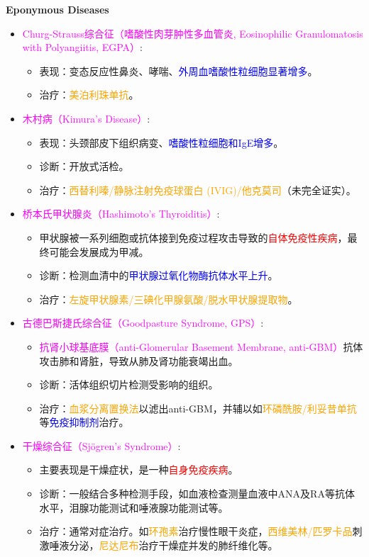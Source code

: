 \documentclass[UTF8]{book}
\newcommand{\concept}[1]{\textcolor{magenta}{#1}}
\newcommand{\drug}[1]{\textcolor{orange}{#1}}
\newcommand{\imp}[1]{\textcolor{red}{#1}}
\renewcommand{\emph}[1]{\textcolor{blue}{#1}}
\begin{document}
\noindent\textbf{Eponymous Diseases}
\begin{itemize}
\item \concept{Churg-Strauss综合征（嗜酸性肉芽肿性多血管炎, Eosinophilic Granulomatosis with Polyangiitis, EGPA）}:
\begin{itemize}
	\item 表现：变态反应性鼻炎、哮喘、\emph{外周血嗜酸性粒细胞显著增多}。
	\item 治疗：\drug{美泊利珠单抗}。
\end{itemize}
\item \concept{木村病（Kimura's Disease）}:
\begin{itemize}
	\item 表现：头颈部皮下组织病变、\emph{嗜酸性粒细胞和IgE增多}。
	\item 诊断：开放式活检。
	\item 治疗：\drug{西替利嗪/静脉注射免疫球蛋白 (IVIG)/他克莫司}（未完全证实）。
\end{itemize}
\item \concept{桥本氏甲状腺炎（Hashimoto's Thyroiditis）}:
\begin{itemize}
	\item 甲状腺被一系列细胞或抗体接到免疫过程攻击导致的\imp{自体免疫性疾病}，最终可能会发展成为甲减。
	\item 诊断：检测血清中的\emph{甲状腺过氧化物酶抗体水平上升}。
	\item 治疗：\drug{左旋甲状腺素/三碘化甲腺氨酸/脱水甲状腺提取物}。
\end{itemize}
\item \concept{古德巴斯捷氏综合征（Goodpasture Syndrome, GPS）}:
\begin{itemize}
	\item \concept{抗肾小球基底膜（anti-Glomerular Basement Membrane, anti-GBM）}抗体攻击肺和肾脏，导致从肺及肾功能衰竭出血。
	\item 诊断：活体组织切片检测受影响的组织。
	\item 治疗：\drug{血浆分离置换法}以滤出anti-GBM，并辅以如\drug{环磷酰胺/利妥昔单抗}等\emph{免疫抑制剂}治疗。
\end{itemize}
\item \concept{干燥综合征（Sj\"ogren's Syndrome）}:
\begin{itemize}
	\item 主要表现是干燥症状，是一种\imp{自身免疫疾病}。
	\item 诊断：一般结合多种检测手段，如血液检查测量血液中ANA及RA等抗体水平，泪腺功能测试和唾液腺功能测试等。
	\item 治疗：通常对症治疗。如\drug{环孢素}治疗慢性眼干炎症，\drug{西维美林/匹罗卡品}刺激唾液分泌，\drug{尼达尼布}治疗干燥症并发的肺纤维化等。

\end{itemize}
\end{itemize}
\end{document}
